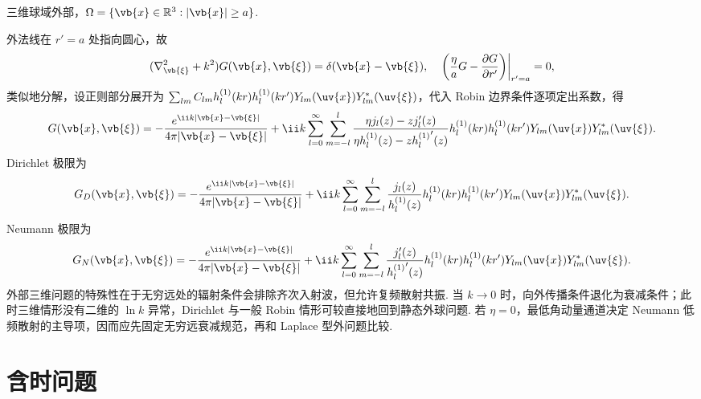 \begin{exbox}
	三维球域外部，\(\Omega=\{\vb{x}\in\mathbb{R}^3:|\vb{x}|\geq a\}\).
	
	外法线在 \(r'=a\) 处指向圆心，故
	\begin{align*}
		(\nabla_{\vb{\xi}}^2+k^2)G(\vb{x},\vb{\xi})=\delta(\vb{x}-\vb{\xi}),
		\quad
		\left.\left(\frac{\eta}{a}G-\frac{\partial G}{\partial r'}\right)\right|_{r'=a}=0,
	\end{align*}
	类似地分解，设正则部分展开为 \(\sum_{lm}C_{lm}h_l^{(1)}(kr)h_l^{(1)}(kr')Y_{lm}(\uv{x})Y_{lm}^*(\uv{\xi})\)，代入 Robin 边界条件逐项定出系数，得
	\begin{align*}
		G(\vb{x},\vb{\xi})=-\frac{e^{\ii k|\vb{x}-\vb{\xi}|}}{4\pi|\vb{x}-\vb{\xi}|}
		+\ii k\sum_{l=0}^{\infty}\sum_{m=-l}^{l}
		\frac{\eta j_l(z)-zj_l'(z)}{\eta h_l^{(1)}(z)-z{h_l^{(1)}}'(z)}
		h_l^{(1)}(kr)h_l^{(1)}(kr')Y_{lm}(\uv{x})Y_{lm}^*(\uv{\xi}).
	\end{align*}
	Dirichlet 极限为
	\begin{align*}
		G_D(\vb{x},\vb{\xi})=-\frac{e^{\ii k|\vb{x}-\vb{\xi}|}}{4\pi|\vb{x}-\vb{\xi}|}
		+\ii k\sum_{l=0}^{\infty}\sum_{m=-l}^{l}
		\frac{j_l(z)}{h_l^{(1)}(z)}h_l^{(1)}(kr)h_l^{(1)}(kr')Y_{lm}(\uv{x})Y_{lm}^*(\uv{\xi}).
	\end{align*}
	Neumann 极限为
	\begin{align*}
		G_N(\vb{x},\vb{\xi})=-\frac{e^{\ii k|\vb{x}-\vb{\xi}|}}{4\pi|\vb{x}-\vb{\xi}|}
		+\ii k\sum_{l=0}^{\infty}\sum_{m=-l}^{l}
		\frac{j_l'(z)}{{h_l^{(1)}}'(z)}h_l^{(1)}(kr)h_l^{(1)}(kr')Y_{lm}(\uv{x})Y_{lm}^*(\uv{\xi}).
	\end{align*}
	外部三维问题的特殊性在于无穷远处的辐射条件会排除齐次入射波，但允许复频散射共振. 当 \(k\to0\) 时，向外传播条件退化为衰减条件；此时三维情形没有二维的 \(\ln k\) 异常，Dirichlet 与一般 Robin 情形可较直接地回到静态外球问题. 若 \(\eta=0\)，最低角动量通道决定 Neumann 低频散射的主导项，因而应先固定无穷远衰减规范，再和 Laplace 型外问题比较.
\end{exbox}


\section{含时问题}

